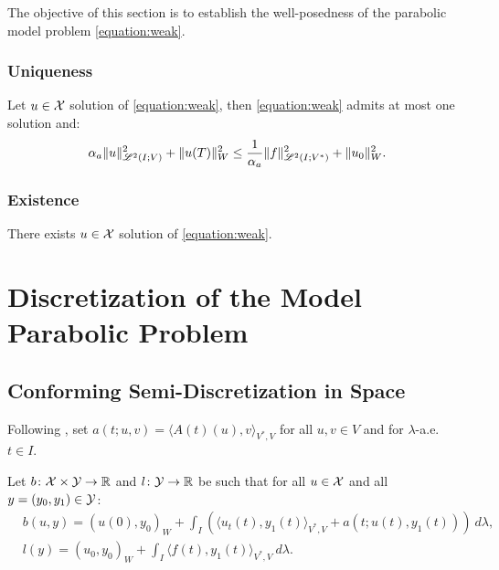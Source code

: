 The objective of this section is to establish the well-posedness of the parabolic model problem \eqref{equation:weak}.

\subsubsection{Uniqueness}

\begin{lemma}
    Let $u \in \mathcal{X}$ solution of \eqref{equation:weak}, then \eqref{equation:weak} admits at most one solution and:
    \begin{gather}
        \alpha_{a} \lVert u \rVert_{\mathscr{L}^{2}(I; V)}^2 + \lVert u(T) \rVert_W^2 \leq \frac{1}{\alpha_{a}} \lVert f \rVert_{\mathscr{L}^{2}(I; V^*)}^2 + \lVert u_0 \rVert_W^2.
    \end{gather}
\end{lemma}



\subsubsection{Existence}

\begin{lemma}[Existence]
    There exists $u \in \mathcal{X}$ solution of \eqref{equation:weak}.
\end{lemma}


\newpage
\section{Discretization of the Model Parabolic Problem}

\subsection{Conforming Semi-Discretization in Space}

Following \cite[p. 135]{Ern2021}, set $a(t; u, v) = \langle A(t)(u), v \rangle_{V^*, V}$ for all $u, v \in V$ and for $\lambda$-a.e. $t \in I$.

\begin{definition}[$b$ and $l$]
    Let $b \colon \mathcal{X} \times \mathcal{Y} \rightarrow \mathbb{R}$ and $l \colon \mathcal{Y} \rightarrow \mathbb{R}$ be such that for all $u \in \mathcal{X}$ and all $y = (y_0, y_1) \in \mathcal{Y}$:
    \begin{align}
        & b(u, y) = \left( u(0), y_0 \right)_W + \int_I \left( \langle u_t(t), y_1(t) \rangle_{V^*, V} + a(t; u(t), y_1(t)) \right)~ d \lambda, \\
        & l(y) = \left( u_0, y_0 \right)_W + \int_I \langle f(t), y_1(t) \rangle_{V^*, V} ~ d \lambda.
    \end{align}
\end{definition}

